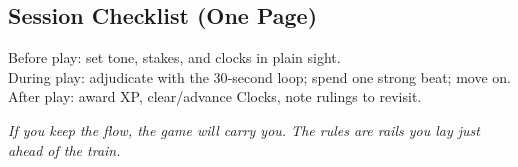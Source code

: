\subsection{Session Checklist (One Page)}
Before play: set tone, stakes, and clocks in plain sight.\\
During play: adjudicate with the 30‑second loop; spend one strong beat; move on.\\
After play: award XP, clear/advance Clocks, note rulings to revisit.

\bigskip
\noindent\textit{If you keep the flow, the game will carry you. The rules are rails you lay just ahead of the train.}